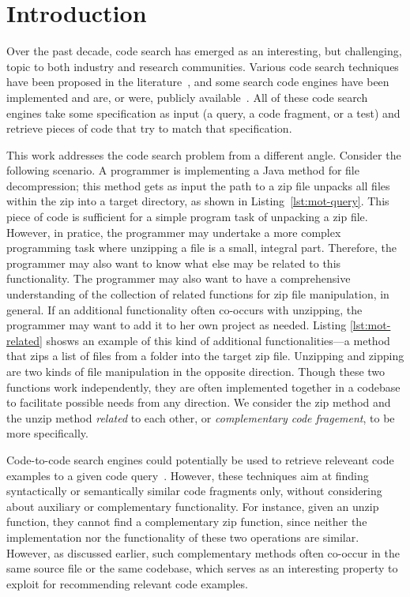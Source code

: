 \section{Introduction}
\label{sec:intro}

Over the past decade, code search has emerged as an interesting, but
challenging, topic to both industry and research communities. Various code search
techniques have been proposed in the
literature~\cite{bajracharya2009sourcerer,reiss2009semantics,lazzarini2009applying,mcmillan2012exemplar}, and
some search code engines have been implemented and are, or were, publicly
available~\cite{googlesearch, github,codase,krugle,ohloh,searchcode}. All
of these code search engines take some specification as input (a
query, a code fragment, or a test) and retrieve pieces of code that try
to match that specification.


This work addresses the code search problem from a different angle. Consider
the following scenario. A programmer is implementing a Java method for
file decompression; this method gets as input the path to a zip file
unpacks all files within the zip into a target directory, as shown in 
Listing~\ref{lst:mot-query}. This piece of code is sufficient for 
a simple program task of unpacking a zip file. However, in pratice, the programmer 
may undertake a more complex programming task where unzipping a file is a small,
integral part. Therefore, the programmer may also want to know what else may be
related to this functionality. %
The programmer may also want to have a comprehensive understanding of the collection of related
functions for zip file manipulation, in general. If an additional
functionality often co-occurs with unzipping, the programmer may want to add it
to her own project as needed. Listing \ref{lst:mot-related} shosws an example of this kind of additional 
functionalities---a method that zips a list of files from a folder into the target zip file. Unzipping
and zipping are two kinds of file manipulation in the opposite direction. 
Though these two functions work independently, they are often implemented together in a codebase to facilitate
possible needs from any direction. We consider the zip method and the unzip method {\em related} to each other, or {\em complementary code fragement}, to be more specifically.



Code-to-code search engines could potentially be used to retrieve releveant code examples
to a given code query~\cite{kim2018Facoy, krugle, searchcode}. 
However, these techniques aim at finding syntactically or semantically 
similar code fragments only, without considering about auxiliary or complementary functionality. 
For instance, given an unzip function, they cannot find a complementary zip function, since neither
the implementation nor the functionality of these two operations are similar. However, as discussed earlier,
such complementary methods often co-occur in the same source file or the same codebase, which serves as 
an interesting property to exploit for recommending relevant code examples.

